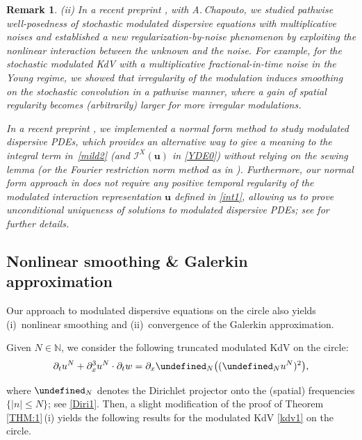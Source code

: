 \documentclass[letterpaper, 11pt,  reqno]{amsart}
\newtheorem{remark}[theorem]{Remark}
\newcommand{\1}{\hspace{0.5mm}\text{I}\hspace{0.5mm}}
\newcommand{\I}{\mathcal{I}}
\newcommand{\noi}{\noindent}
\let\P= \undefined
\newcommand{\P}{\mathbf{P}}
\newcommand{\dx}{\partial_x}
\newcommand{\dt}{\partial_t}
\newcommand{\N}{\mathbb{N}}
\newcommand{\uu}{\mathbf{u}}
\numberwithin{equation}{section}
\numberwithin{theorem}{section}
\begin{document}
\begin{remark}
\smallskip


\noi
(ii)
In a recent preprint
\cite{CGLLO2}, with A.\,Chapouto, 
we studied pathwise well-posedness of stochastic modulated dispersive equations with 
multiplicative noises and established a new regularization-by-noise phenomenon by exploiting the nonlinear interaction between the unknown and the noise. For example, for the stochastic 
modulated KdV with a multiplicative fractional-in-time noise in the Young regime, we showed that irregularity of the modulation induces smoothing on the stochastic convolution in a pathwise manner, where a gain of spatial regularity becomes (arbitrarily) larger for more irregular modulations.

In a recent preprint \cite{GLLO}, 
we implemented a  normal form method to study modulated dispersive PDEs,
which provides an alternative way to give a meaning to the 
integral term in~\eqref{mild2} (and 
$ \I^X(\uu)$ in \eqref{YDE0})
without relying on the sewing lemma (or the Fourier restriction norm method 
as in  \cite{Robert2, Robert3}).
Furthermore, our normal form approach in \cite{GLLO}
does not require any positive temporal regularity
of the modulated interaction representation
$\uu$ defined in \eqref{int1}, allowing us to prove 
unconditional uniqueness of solutions
to modulated dispersive PDEs; see \cite{GLLO}
for further details.

\end{remark}



\subsection{Nonlinear smoothing \& Galerkin approximation}


Our approach to  modulated dispersive equations on the circle
also yields
(i)~nonlinear smoothing 
and (ii)~convergence of the Galerkin approximation.







Given $N \in \N$, 
we consider 
the following truncated modulated KdV on the circle:
\begin{equation}
\label{kdv1x}
\dt u^N+  \dx^3 u^N \cdot \dt w =\dx \P_N\big((\P_Nu^N)^2\big), 
\end{equation}

\noi
where   $\P_N$ denotes  the Dirichlet projector onto the (spatial) frequencies 
$\{|n| \leq N\}$; see \eqref{Diri1}.
Then, a slight modification of the proof of Theorem \ref{THM:1}\,(i)
yields  the following results
for the modulated KdV \eqref{kdv1} on the circle.
\end{document}
